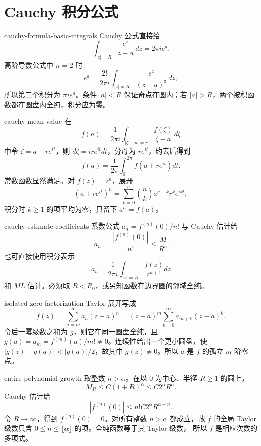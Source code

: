 \chapter{Cauchy 积分公式}
\label{chap:cauchy-integral-formula-solutions}

\begin{solution}{cauchy-formula-basic-integrals}
Cauchy 公式直接给
\[
 \int_{|z|=R}\frac{e^z}{z-a}\,dz=2\pi i e^a.
\]
高阶导数公式中 \(n=2\) 时
\[
 e^a=\frac{2!}{2\pi i}
 \int_{|z|=R}\frac{e^z}{(z-a)^3}\,dz,
\]
所以第二个积分为 \(\pi i e^a\)。条件 \(|a|<R\) 保证奇点在圆内；若
\(|a|>R\)，两个被积函数都在圆盘内全纯，积分应为零。
\end{solution}

\begin{solution}{cauchy-mean-value}
在
\[
 f(a)=\frac1{2\pi i}\int_{|\zeta-a|=r}
 \frac{f(\zeta)}{\zeta-a}\,d\zeta
\]
中令 \(\zeta=a+re^{it}\)，则
\(d\zeta=ire^{it}dt\)，分母为 \(re^{it}\)，约去后得到
\[
 f(a)=\frac1{2\pi}\int_0^{2\pi}f(a+re^{it})dt.
\]
常数函数显然满足。对 \(f(z)=z^n\)，展开
\[
 (a+re^{it})^n=\sum_{k=0}^n\binom nk a^{n-k}r^ke^{ikt};
\]
积分时 \(k\ge1\) 的项平均为零，只留下 \(a^n=f(a)\)。
\end{solution}

\begin{solution}{cauchy-estimate-coefficients}
系数公式 \(a_n=f^{(n)}(0)/n!\) 与 Cauchy 估计给
\[
 |a_n|=\frac{|f^{(n)}(0)|}{n!}\le\frac M{R^n}.
\]
也可直接使用积分表示
\[
 a_n=\frac1{2\pi i}\int_{|z|=R}\frac{f(z)}{z^{n+1}}dz
\]
和 \(ML\) 估计。必须取 \(R<R_0\)，或另知函数在边界圆的邻域全纯。
\end{solution}

\begin{solution}{isolated-zero-factorization}
Taylor 展开写成
\[
 f(z)=\sum_{n=m}^{\infty}a_n(z-a)^n
 =(z-a)^m\sum_{k=0}^{\infty}a_{m+k}(z-a)^k.
\]
令后一幂级数之和为 \(g\)，则它在同一圆盘全纯，且
\(g(a)=a_m=f^{(m)}(a)/m!\ne0\)。连续性给出一个更小圆盘，使
\(|g(z)-g(a)|<|g(a)|/2\)，故其中 \(g(z)\ne0\)。所以 \(a\) 是
\(f\) 的孤立 \(m\) 阶零点。
\end{solution}

\begin{solution}{entire-polynomial-growth}
取整数 \(n>\alpha\)。在以 \(0\) 为中心、半径 \(R\ge1\) 的圆上，
\[
 M_R\le C(1+R)^\alpha\le C2^\alpha R^\alpha.
\]
Cauchy 估计给
\[
 |f^{(n)}(0)|\le n!C2^\alpha R^{\alpha-n}.
\]
令 \(R\to\infty\)，得到 \(f^{(n)}(0)=0\)。对所有整数
\(n>\alpha\) 都成立，故 \(f\) 的全局 Taylor 级数只含
\(0\le n\le\lfloor\alpha\rfloor\) 的项。全纯函数等于其 Taylor 级数，
所以 \(f\) 是相应次数的多项式。
\end{solution}

